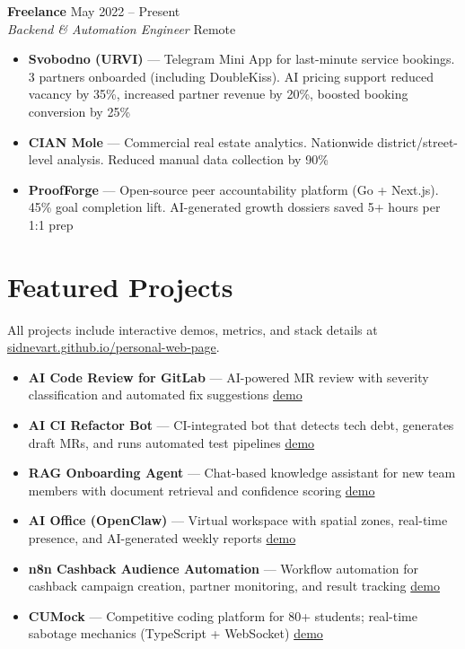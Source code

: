 \documentclass[11pt,a4paper]{article}
\newcommand{\cventry}[4]{%
  \noindent\textbf{#1} \hfill \textcolor{muted}{\small #2}\\[-2pt]
  \textit{#3} \hfill \textcolor{muted}{\small #4}\\[2pt]
}
\newcommand{\projectline}[3]{%
  \textbf{#1} — #2 \hfill \href{#3}{\textcolor{linkblue}{\small demo}}
}
\begin{document}
\cventry{Freelance}{May 2022 – Present}{Backend \& Automation Engineer}{Remote}
\begin{itemize}
  \item \textbf{Svobodno (URVI)} — Telegram Mini App for last-minute service bookings. 3 partners onboarded (including DoubleKiss). AI pricing support reduced vacancy by 35\%, increased partner revenue by 20\%, boosted booking conversion by 25\%
  \item \textbf{CIAN Mole} — Commercial real estate analytics. Nationwide district/street-level analysis. Reduced manual data collection by 90\%
  \item \textbf{ProofForge} — Open-source peer accountability platform (Go + Next.js). 45\% goal completion lift. AI-generated growth dossiers saved 5+ hours per 1:1 prep
\end{itemize}

\section{Featured Projects}
All projects include interactive demos, metrics, and stack details at \href{https://sidnevart.github.io/personal-web-page}{sidnevart.github.io/personal-web-page}.

\begin{itemize}
  \item \projectline{AI Code Review for GitLab}{AI-powered MR review with severity classification and automated fix suggestions}{https://sidnevart.github.io/personal-web-page/projects/ai-code-review}
  \item \projectline{AI CI Refactor Bot}{CI-integrated bot that detects tech debt, generates draft MRs, and runs automated test pipelines}{https://sidnevart.github.io/personal-web-page/projects/ai-ci-refactor}
  \item \projectline{RAG Onboarding Agent}{Chat-based knowledge assistant for new team members with document retrieval and confidence scoring}{https://sidnevart.github.io/personal-web-page/projects/rag-onboarding}
  \item \projectline{AI Office (OpenClaw)}{Virtual workspace with spatial zones, real-time presence, and AI-generated weekly reports}{https://sidnevart.github.io/personal-web-page/projects/ai-office}
  \item \projectline{n8n Cashback Audience Automation}{Workflow automation for cashback campaign creation, partner monitoring, and result tracking}{https://sidnevart.github.io/personal-web-page/projects/n8n-automation}
  \item \projectline{CUMock}{Competitive coding platform for 80+ students; real-time sabotage mechanics (TypeScript + WebSocket)}{https://sidnevart.github.io/personal-web-page/projects/cumock}
\end{itemize}
\end{document}
